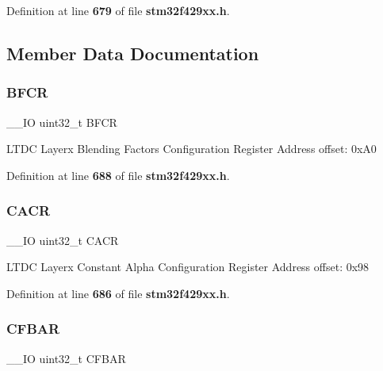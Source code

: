 Definition at line \textbf{ 679} of file \textbf{ stm32f429xx.\+h}.



\subsection{Member Data Documentation}
\mbox{\label{structLTDC__Layer__TypeDef_a8a598358c93b94fe534a4ed8aeb05220}} 
\subsubsection{B\+F\+CR}
{\footnotesize\ttfamily \+\_\+\+\_\+\+IO uint32\+\_\+t B\+F\+CR}

L\+T\+DC Layerx Blending Factors Configuration Register Address offset\+: 0x\+A0 

Definition at line \textbf{ 688} of file \textbf{ stm32f429xx.\+h}.

\mbox{\label{structLTDC__Layer__TypeDef_a47be8b57cf19a433c0682d91a0524463}} 
\subsubsection{C\+A\+CR}
{\footnotesize\ttfamily \+\_\+\+\_\+\+IO uint32\+\_\+t C\+A\+CR}

L\+T\+DC Layerx Constant Alpha Configuration Register Address offset\+: 0x98 

Definition at line \textbf{ 686} of file \textbf{ stm32f429xx.\+h}.

\mbox{\label{structLTDC__Layer__TypeDef_a11b37b8303d2ddad1ee962c362cad796}} 
\subsubsection{C\+F\+B\+AR}
{\footnotesize\ttfamily \+\_\+\+\_\+\+IO uint32\+\_\+t C\+F\+B\+AR}

